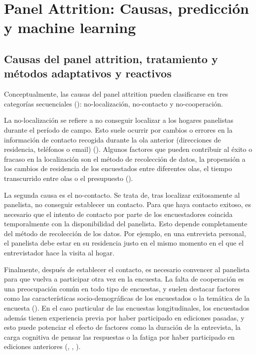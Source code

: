 \chapter{Panel Attrition: Causas, predicción y machine learning}
\label{chapter:attrition}
\section{Causas del panel attrition, tratamiento y métodos adaptativos y reactivos}
\label{section:causes_attrition}

Conceptualmente, las causas del panel attrition pueden clasificarse en tres categorías secuenciales (\cite{lepkowski2002nonresponse}): no-localización, no-contacto y no-cooperación.

La no-localización se refiere a no conseguir localizar a los hogares panelistas durante el período de campo. Esto suele ocurrir por cambios o errores en la información de contacto recogida durante la ola anterior (direcciones de residencia, teléfonos o email) (\cite{couper2009keeping}). Algunos factores que pueden contribuir al éxito o fracaso en la localización son el método de recolección de datos, la propensión a los cambios de residencia de los encuestados entre diferentes olas, el tiempo transcurrido entre olas o el presupuesto (\cite{lynn2009methods}).

La segunda causa es el no-contacto. Se trata de, tras localizar exitosamente al panelista, no conseguir establecer un contacto. Para que haya contacto exitoso, es necesario que el intento de contacto por parte de los encuestadores coincida temporalmente con la disponibilidad del panelista. Esto depende completamente del método de recolección de los datos. Por ejemplo, en una entrevista personal, el panelista debe estar en su residencia justo en el mismo momento en el que el entrevistador hace la visita al hogar.

Finalmente, después de establecer el contacto, es necesario convencer al panelista para que vuelva a participar otra vez en la encuesta. La falta de cooperación es una preocupación común en todo tipo de encuestas, y suelen destacar factores como las características socio-demográficas de los encuestados o la temática de la encuesta (\cite{groves1992understanding}). En el caso particular de las encuestas longitudinales, los encuestados además tienen experiencia previa por haber participado en ediciones pasadas, y esto puede potenciar el efecto de factores como la duración de la entrevista, la carga cognitiva de pensar las respuestas o la fatiga por haber participado en ediciones anteriores (\cite{laurie1999strategies}, \cite{watson2009identifying}, \cite{lynn2018tackling}).

